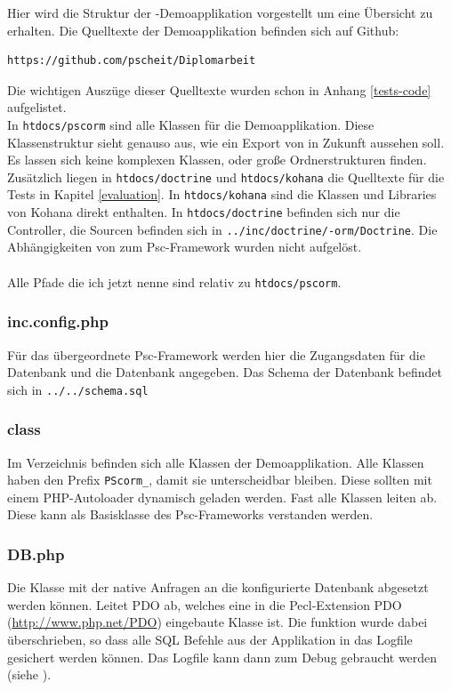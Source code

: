 Hier wird die Struktur der \PSCORM-Demoapplikation vorgestellt um eine Übersicht zu erhalten. Die Quelltexte der Demoapplikation befinden sich auf Github:
\begin{verbatim}
https://github.com/pscheit/Diplomarbeit
\end{verbatim}
\noindent Die wichtigen Auszüge dieser Quelltexte wurden schon in Anhang \ref{tests-code} aufgelistet. \\
In \texttt{htdocs/pscorm} sind alle Klassen für die Demoapplikation. Diese Klassenstruktur sieht genauso aus, wie ein Export von \PSCORM in Zukunft aussehen soll. Es lassen sich keine komplexen Klassen, oder große Ordnerstrukturen finden. \\
Zusätzlich liegen in \texttt{htdocs/doctrine} und \texttt{htdocs/kohana} die Quelltexte für die Tests in Kapitel \ref{evaluation}. In \texttt{htdocs/kohana} sind die Klassen und Libraries von Kohana direkt enthalten. In \texttt{htdocs/doctrine} befinden sich nur die Controller, die Sourcen befinden sich in \texttt{../inc/doctrine/-orm/Doctrine}. Die Abhängigkeiten von \PSCORM zum Psc-Framework wurden nicht aufgelöst. \\
\\
Alle Pfade die ich jetzt nenne sind relativ zu \texttt{htdocs/pscorm}. \\
\subsubsection{inc.config.php}
Für das übergeordnete Psc-Framework werden hier die Zugangsdaten für die Datenbank und die Datenbank angegeben. Das Schema der Datenbank befindet sich in \texttt{../../schema.sql}

\subsubsection{class}
Im Verzeichnis befinden sich alle Klassen der Demoapplikation. Alle Klassen haben den Prefix \texttt{PScorm\_}, damit sie unterscheidbar bleiben. Diese sollten mit einem PHP-Autoloader dynamisch geladen werden. Fast alle Klassen leiten  ab. Diese kann als Basisklasse des Psc-Frameworks verstanden werden.

\subsubsection{DB.php}
Die Klasse mit der native Anfragen an die konfigurierte Datenbank abgesetzt werden können. Leitet PDO ab, welches eine in die Pecl-Extension PDO (\url{http://www.php.net/PDO}) eingebaute Klasse ist. Die funktion  wurde dabei überschrieben, so dass alle SQL Befehle aus der Applikation in das Logfile gesichert werden können. Das Logfile kann dann zum Debug gebraucht werden (siehe ).

